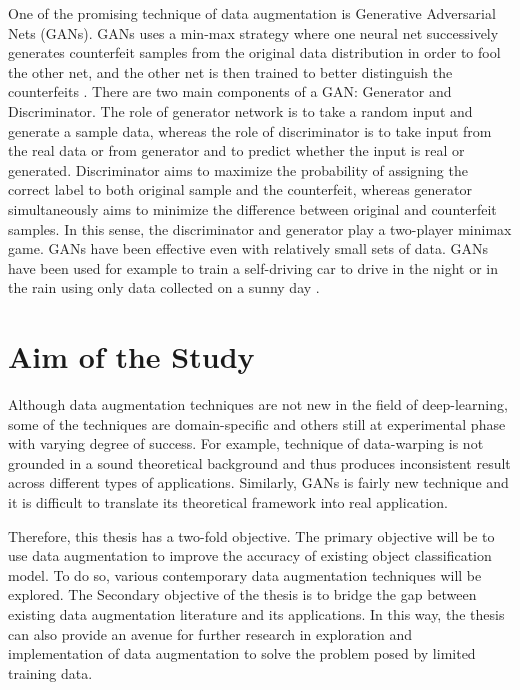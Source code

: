 \documentclass[12pt,a4paper,oneside,pdftex]{report}
\begin{document}
	One of the promising technique of data augmentation is Generative Adversarial Nets (GANs). GANs uses a min-max strategy where one neural net successively generates counterfeit samples from the original data distribution in order to fool the other net, and the other net is then trained to better distinguish the counterfeits \citep{goodfellow2014generative}. There are two main components of a GAN: Generator and Discriminator. The role of generator network is to take a random input and generate a sample data, whereas the role of discriminator is to take input from the real data or from generator and to predict whether the input is real or generated. Discriminator aims to maximize the probability of assigning the correct label to both original sample and the counterfeit, whereas generator simultaneously aims to minimize the difference between original and counterfeit samples. In this sense, the discriminator and generator play a two-player minimax game. GANs have been effective even with relatively small sets of data. GANs have been used for example to train a self-driving car to drive in the night or in the rain using only data collected on a sunny day \citep{gurumurthy2017deligan}. 
	
	
	\section{Aim of the Study}
	
	Although data augmentation techniques are not new in the field of deep-learning, some of the techniques are domain-specific and others still at experimental phase with varying degree of success. For example, technique of data-warping is not grounded in a sound theoretical background and thus produces inconsistent result across different types of applications. Similarly, GANs is fairly new technique and it is difficult to translate its theoretical framework into real application.
	
	Therefore, this thesis has a two-fold objective. The primary objective will be to use data augmentation to improve the accuracy of existing object classification model. To do so, various contemporary data augmentation techniques will be explored. The Secondary objective of the thesis is to bridge the gap between existing data augmentation literature and its applications. In this way, the thesis can also provide an avenue for further research in exploration and implementation of data augmentation to solve the problem posed by limited training data. 
	
\end{document}
